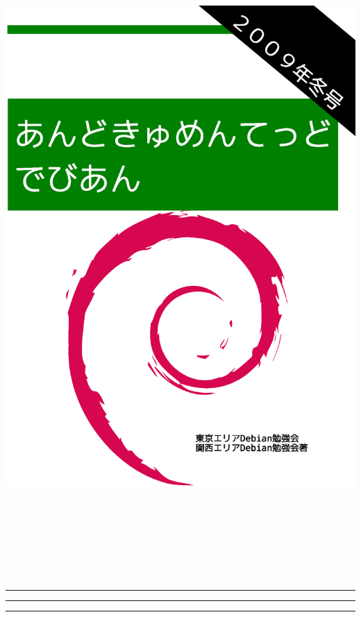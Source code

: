 \documentclass[mingoth,a4paper]{jsarticle}
\begin{document}
\begin{titlepage}
\includegraphics[height=252mm]{image2009-fuyu/2009-winter.eps}
\end{titlepage}

\newpage
\thispagestyle{empty}\mbox{}
\newpage

\setcounter{page}{1}
\begin{minipage}[]{0.2\hsize}
 \colorbox{dancerlightblue}{}
\end{minipage}
\begin{minipage}[]{0.8\hsize}
\hrule
\vspace{1mm}
\hrule
\setcounter{tocdepth}{1}
{\small
 \tableofcontents}
\vspace{1mm}
\hrule
\vspace{3cm}

\end{minipage}
\end{document}
